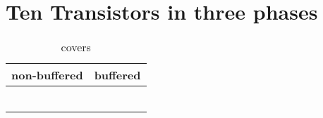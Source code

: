 \section{Ten Transistors in three phases}

\begin{table}[ht]
\centering
\caption*{covers}

\begin{tabular}{cc}
    \toprule
    non-buffered & buffered \\
    \midrule

    \nameref{cell:AOAI221} & \nameref{cell:AOA221} \\
    \nameref{cell:OAOI221} & \nameref{cell:OAO221} \\
    \nameref{cell:AOOAI212} & \nameref{cell:AOOA212} \\
    \nameref{cell:OOAOI212} & \nameref{cell:OOAO212} \\
    \nameref{cell:AAOAI221} & \nameref{cell:AAOA221} \\
    \nameref{cell:OOAOI221} & \nameref{cell:OOAO221}

\end{tabular}

\end{table}

 
 
 
 
 
 
